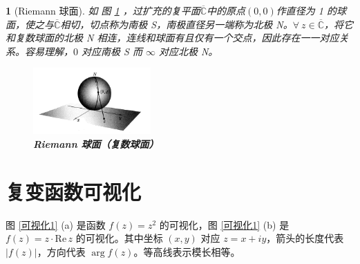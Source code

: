 \documentclass[UTF8]{report}
\def\Re{\mathrm{Re\,}}
\def\C{\mathbb{C}}
\theoremstyle{MyLineTheoremStyle} %
\theoremstyle{MyBlockTheoremStyle} %
\theoremstyle{MySubsubsectionStyle} %
\newtheorem{definition}{}
\begin{document}
\begin{definition}[Riemann 球面]
如 图 \ref{Riemann 球面（复数球面）} ，过扩充的复平面$\overline{\C}$中的原点$(0,0)$作直径为 1 的球面，使之与$\overline{\C}$相切，切点称为南极 S，南极直径另一端称为北极 N。$\forall\ z \in \overline{\C}$，将它和复数球面的北极 N 相连，连线和球面有且仅有一个交点，因此存在一一对应关系。容易理解，$0$ 对应南极 S 而 $\infty$ 对应北极 N。

\begin{figure}[H]\centering
\includegraphics[width=0.40\textwidth]{assets/1,2/79ee2f440c28e683147e653d153efc72.png}
\caption{\textbf{Riemann 球面（复数球面）}}\label{Riemann 球面（复数球面）}
\end{figure}
\end{definition}

\section{复变函数可视化}
图 \ref{可视化1} (a) 是函数 $f(z) = z^2$ 的可视化，图 \ref{可视化1} (b) 是 $f(z) = z\cdot \Re z$ 的可视化。其中坐标 $(x,y)$ 对应 $z = x + iy$，箭头的长度代表 $| f(z) |$，方向代表 $\arg f(z)$。等高线表示模长相等。
\end{document}
